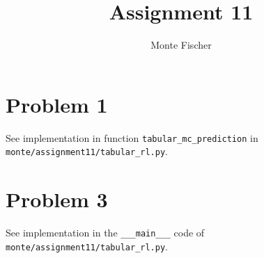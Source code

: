 \documentclass{article}
\title{Assignment 11}
\author{Monte Fischer}
\begin{document}
\maketitle

\section*{Problem 1}

See implementation in function \texttt{tabular\_mc\_prediction} in \texttt{monte/assignment11/tabular\_rl.py}.

\section*{Problem 3}

See implementation in the \texttt{\_\_\_main\_\_\_} code of \texttt{monte/assignment11/tabular\_rl.py}.
\end{document}
